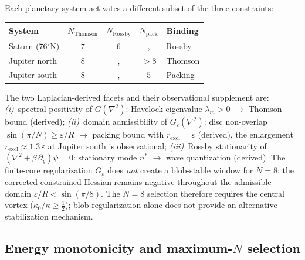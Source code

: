 Each planetary system activates a different subset of the three
constraints:
\begin{center}
\begin{tabular}{lcccl}
\toprule
System & $N_{\mathrm{Thomson}}$ & $N_{\mathrm{Rossby}}$ & $N_{\mathrm{pack}}$ & Binding \\
\midrule
Saturn (76${}^\circ$N)  & $7$ & $6$ &,  & Rossby \\
Jupiter north           & $8$ &, & $>8$ & Thomson \\
Jupiter south           & $8$ &, & $5$  & Packing \\
\bottomrule
\end{tabular}
\end{center}

\noindent
The two Laplacian-derived facets and their observational supplement are:
\emph{(i)}~spectral positivity of $G(\nabla^2)$: Havelock
eigenvalue $\lambda_m > 0$ $\to$ Thomson bound (derived);
\emph{(ii)}~domain admissibility of $G_\varepsilon(\nabla^2)$:
disc non-overlap $\sin(\pi/N) \ge \varepsilon/R$ $\to$ packing
bound with $r_{\mathrm{excl}} = \varepsilon$ (derived),
the enlargement $r_{\mathrm{excl}} \approx 1.3\,\varepsilon$
at Jupiter south is observational;
\emph{(iii)}~Rossby stationarity of $(\nabla^2 + \beta\,\partial_y)\psi = 0$:
stationary mode $n^*$ $\to$ wave quantization (derived).
The finite-core regularization $G_\varepsilon$ does \emph{not} create
a blob-stable window for $N = 8$: the corrected constrained Hessian
remains negative throughout the admissible domain
$\varepsilon/R < \sin(\pi/8)$.  The $N = 8$ selection therefore
requires the central vortex ($\kappa_0/\kappa \ge \tfrac{1}{2}$);
blob regularization alone does not provide an alternative stabilization
mechanism.

\subsection{Energy monotonicity and maximum-$N$ selection}
\label{sec:energy-monotonicity}


